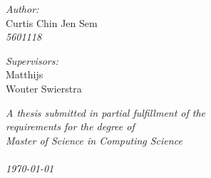 \begin{titlepage}
  \begin{minipage}{0.48\textwidth}
    \begin{flushleft}
      \textit{Author:} \\
      Curtis Chin Jen Sem \\
      \textit{5601118}
    \end{flushleft}
  \end{minipage}
  \begin{minipage}{0.48\textwidth}
    \begin{flushright}
    \textit{Supervisors:} \\
    Matthijs \Vakar \\
    Wouter Swierstra \\
    \end{flushright}
  \end{minipage}

  \vspace{0.8in}

  \textit{A thesis submitted in partial fulfillment of the\\ requirements for the degree of}\\
  \vspace{0.1in}
  \textit{\Large Master of Science in Computing Science}\\
  \vspace{1.2in}
   \\
  \textit{\today}
  \thispagestyle{empty}
\end{titlepage}
